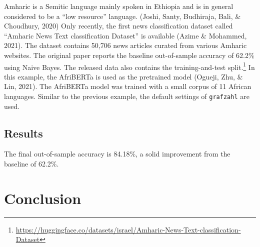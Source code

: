 \documentclass[
  english,
  man,floatsintext]{apa6}
\newenvironment{Shaded}{\begin{snugshade}}{\end{snugshade}}
\newcommand{\CommentTok}[1]{\textcolor[rgb]{0.56,0.35,0.01}{\textit{#1}}}
\newcommand{\DataTypeTok}[1]{\textcolor[rgb]{0.13,0.29,0.53}{#1}}
\newcommand{\KeywordTok}[1]{\textcolor[rgb]{0.13,0.29,0.53}{\textbf{#1}}}
\newcommand{\NormalTok}[1]{#1}
\newcommand{\OperatorTok}[1]{\textcolor[rgb]{0.81,0.36,0.00}{\textbf{#1}}}
\newcommand{\StringTok}[1]{\textcolor[rgb]{0.31,0.60,0.02}{#1}}
\begin{document}
Amharic is a Semitic language mainly spoken in Ethiopia and is in general considered to be a ``low resource'' language. (Joshi, Santy, Budhiraja, Bali, \& Choudhury, 2020) Only recently, the first news classification dataset called ``Amharic News Text classification Dataset'' is available (Azime \& Mohammed, 2021). The dataset contains 50,706 news articles curated from various Amharic websites. The original paper reports the baseline out-of-sample accuracy of 62.2\% using Naive Bayes. The released data also contains the training-and-test split.\footnote{\url{https://huggingface.co/datasets/israel/Amharic-News-Text-classification-Dataset}} In this example, the AfriBERTa is used as the pretrained model (Ogueji, Zhu, \& Lin, 2021). The AfriBERTa model was trained with a small corpus of 11 African languages. Similar to the previous example, the default settings of \texttt{grafzahl} are used.

\begin{Shaded}
\end{Shaded}

\hypertarget{results}{%
\subsection{Results}\label{results}}

The final out-of-sample accuracy is 84.18\%, a solid improvement from the baseline of 62.2\%.

\hypertarget{conclusion}{%
\section{Conclusion}\label{conclusion}}
\end{document}
